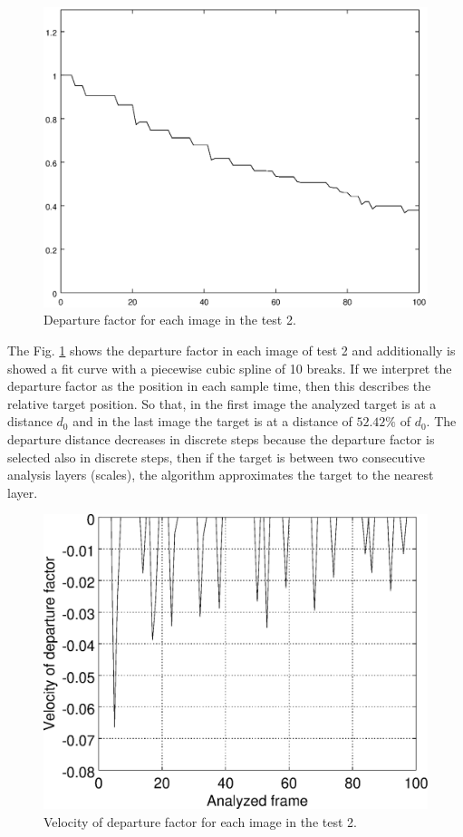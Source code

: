 \begin{figure}[!hbt]
\includegraphics[width=\columnwidth]{images/graph2.eps}
\caption{Departure factor for each image in the test 2.}
\label{fig:res_graph2}
\end{figure}
The Fig. \ref{fig:res_graph2} shows the departure factor in each image
of test 2 and additionally is showed a  fit curve with a piecewise cubic spline 
of 10 breaks. If we interpret the departure factor as the position in each sample time, 
then this describes the relative target position.
So that, in the first image the analyzed target is at a distance $d_0$ 
and in the last image the target is at a distance of $52.42\%$ of $d_0$.
The departure distance decreases in discrete steps because the departure
factor is selected also in discrete steps, then if the target is
between two consecutive analysis layers (scales), the algorithm
approximates the target to the nearest layer. 
\begin{figure}[!hbt]
\includegraphics[width=\columnwidth]{images/graph2v.eps}
\caption{Velocity of departure factor for each image in the test 2.}
\label{fig:res_graph2v}
\end{figure}
